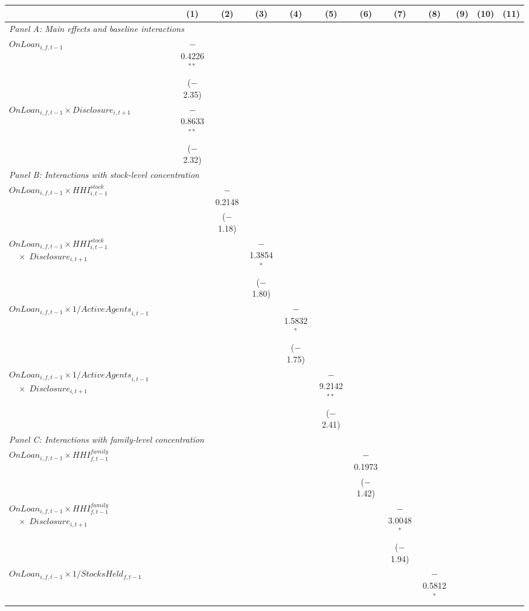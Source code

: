 {\small
\begin{tabular}{l*{11}{c}}
\toprule
 & (1) & (2) & (3) & (4) & (5) & (6) & (7) & (8) & (9) & (10) & (11) \\
\midrule
\multicolumn{12}{l}{\textit{Panel A: Main effects and baseline interactions}} \\[0.3em]
$\mathit{OnLoan}_{i,f,t-1}$ & $-$0.4226$^{**}$ & & & & & & & & & & \\
 & ($-$2.35) & & & & & & & & & & \\[0.3em]
$\mathit{OnLoan}_{i,f,t-1} \times \mathit{Disclosure}_{i,t+1}$ & $-$0.8633$^{**}$ & & & & & & & & & & \\
 & ($-$2.32) & & & & & & & & & & \\[0.3em]
\midrule
\multicolumn{12}{l}{\textit{Panel B: Interactions with stock-level concentration}} \\[0.3em]
$\mathit{OnLoan}_{i,f,t-1} \times \mathit{HHI}^{\mathit{stock}}_{i,t-1}$ & & $-$0.2148 & & & & & & & & & \\
 & & ($-$1.18) & & & & & & & & & \\[0.3em]
$\mathit{OnLoan}_{i,f,t-1} \times \mathit{HHI}^{\mathit{stock}}_{i,t-1}$%
$\quad \times\; \mathit{Disclosure}_{i,t+1}$ & & & $-$1.3854$^{*}$ & & & & & & & & \\
 & & & ($-$1.80) & & & & & & & & \\[0.3em]
$\mathit{OnLoan}_{i,f,t-1} \times 1/\mathit{ActiveAgents}_{i,t-1}$ & & & & $-$1.5832$^{*}$ & & & & & & & \\
 & & & & ($-$1.75) & & & & & & & \\[0.3em]
$\mathit{OnLoan}_{i,f,t-1} \times 1/\mathit{ActiveAgents}_{i,t-1}$%
$\quad \times\; \mathit{Disclosure}_{i,t+1}$ & & & & & $-$9.2142$^{**}$ & & & & & & \\
 & & & & & ($-$2.41) & & & & & & \\[0.3em]
\midrule
\multicolumn{12}{l}{\textit{Panel C: Interactions with family-level concentration}} \\[0.3em]
$\mathit{OnLoan}_{i,f,t-1} \times \mathit{HHI}^{\mathit{family}}_{f,t-1}$ & & & & & & $-$0.1973 & & & & & \\
 & & & & & & ($-$1.42) & & & & & \\[0.3em]
$\mathit{OnLoan}_{i,f,t-1} \times \mathit{HHI}^{\mathit{family}}_{f,t-1}$%
$\quad \times\; \mathit{Disclosure}_{i,t+1}$ & & & & & & & $-$3.0048$^{*}$ & & & & \\
 & & & & & & & ($-$1.94) & & & & \\[0.3em]
$\mathit{OnLoan}_{i,f,t-1} \times 1/\mathit{StocksHeld}_{f,t-1}$ & & & & & & & & $-$0.5812$^{*}$ & & & \\

\end{tabular}}
